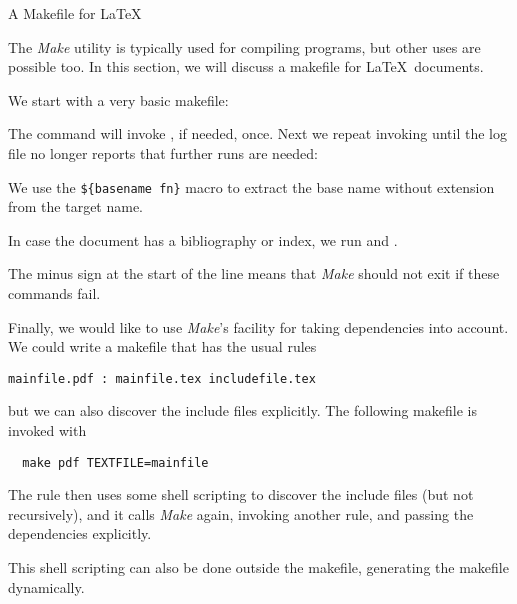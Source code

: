  {A Makefile for \LaTeX}
\label{sec:latex-make}

The \emph{Make} utility is typically used for compiling programs, but
other uses are possible too. In this section, we will discuss a
makefile for \LaTeX\ documents.

We start with a very basic makefile:

The command  will invoke ,
if needed, once. Next we repeat invoking  until the log file no
longer reports that further runs are needed:

We use the \verb+${basename fn}+ macro to extract the base name
without extension from the target name.

In case the document has a bibliography or index, we run 
and . 

The minus sign at the start of the line means that
\emph{Make} should not exit if these commands fail.

Finally, we would like to use \emph{Make}'s facility for taking
dependencies into account. 
We could write a makefile that has
the usual rules
\begin{lstlisting}
mainfile.pdf : mainfile.tex includefile.tex
\end{lstlisting}
but we can also discover the include files explicitly. The following
makefile is invoked with 
\begin{lstlisting}
  make pdf TEXTFILE=mainfile
\end{lstlisting}
The  rule then uses some shell scripting to discover the
include files (but not recursively), and it calls \emph{Make} again,
invoking another rule, and passing the dependencies explicitly.

This shell scripting can also be done outside the makefile, generating
the makefile dynamically.


\endinput

\Level 0 {Cmake}
\index{Cmake|(textbf}

Makefiles can be cumbersome to make, and they may need customization
for any specific installation. For this reason, \emph{Cmake} is a
build system that first generates the makefiles, which can then be
used in the normal manner.

Here are the main components:
\begin{itemize}
\item The source directory has a file \indextermtt{CMakeLists.txt}
  that describes the structure of the application.
\item Generated files can be kept separate from the source:
\begin{lstlisting}
sourcedir=.... # source location
builddir=....  # place for temporaries
installdir=... # here goes the finished stuff
cd ${builddir}
cmake \
  -DCMAKE_PREFIX_PATH=${installdir} \
  ${sourcedir} # do the setup
make           # compile
make install   # move finished stuff in place
\end{lstlisting}
\end{itemize}

